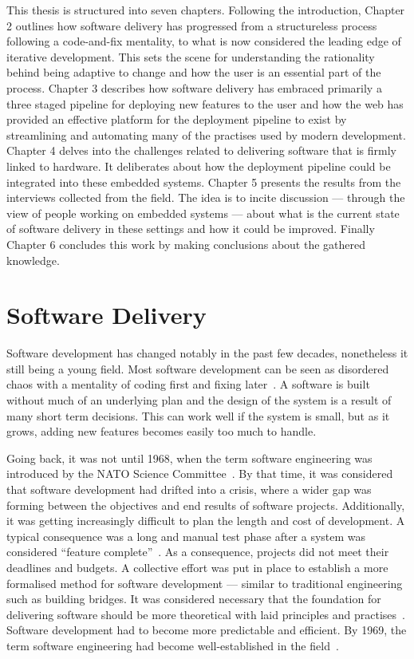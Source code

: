 \documentclass[english]{tktltiki2}
\begin{document}
This thesis is structured into seven chapters. Following the introduction, Chapter 2 outlines how software delivery has progressed from a structureless process following a code-and-fix mentality, to what is now considered the leading edge of iterative development. This sets the scene for understanding the rationality behind being adaptive to change and how the user is an essential part of the process. Chapter 3 describes how software delivery has embraced primarily a three staged pipeline for deploying new features to the user and how the web has provided an effective platform for the deployment pipeline to exist by streamlining and automating many of the practises used by modern development. Chapter 4 delves into the challenges related to delivering software that is firmly linked to hardware. It deliberates about how the deployment pipeline could be integrated into these embedded systems. Chapter 5 presents the results from the interviews collected from the field. The idea is to incite discussion — through the view of people working on embedded systems — about what is the current state of software delivery in these settings and how it could be improved. Finally Chapter 6 concludes this work by making conclusions about the gathered knowledge.


\section{Software Delivery}

Software development has changed notably in the past few decades, nonetheless it still being a young field. Most software development can be seen as disordered chaos with a mentality of coding first and fixing later~\cite{Boe88, Fow05}. A software is built without much of an underlying plan and the design of the system is a result of many short term decisions. This can work well if the system is small, but as it grows, adding new features becomes easily too much to handle.

Going back, it was not until 1968, when the term software engineering was introduced by the NATO Science Committee~\cite{NR69}. By that time, it was considered that software development had drifted into a crisis, where a wider gap was forming between the objectives and end results of software projects. Additionally, it was getting increasingly difficult to plan the length and cost of development. A typical consequence was a long and manual test phase after a system was considered “feature complete”~\cite{Fow05}. As a consequence, projects did not meet their deadlines and budgets. A collective effort was put in place to establish a more formalised method for software development — similar to traditional engineering such as building bridges. It was considered necessary that the foundation for delivering software should be more theoretical with laid principles and practises~\cite{NR69}. Software development had to become more predictable and efficient. By 1969, the term software engineering had become well-established in the field~\cite{BR70}.
\end{document}
